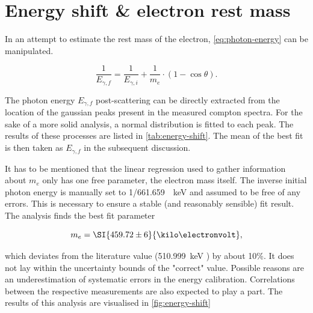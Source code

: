
\section{Energy shift \& electron rest mass}
\label{sec:energy-shift}

In an attempt to estimate the rest mass of the electron, \autoref{eq:photon-energy}
can be manipulated.

\begin{equation}
\label{eq:linear-regression}
\frac{1}{E_{\gamma,f}} = \frac{1}{E_{\gamma,i}} + \frac{1}{m_e}\cdot\left(1-\cos\theta\right).
\end{equation}

The photon energy $E_{\gamma,f}$ post-scattering can be directly extracted from the
location of the gaussian peaks present in the measured compton spectra. For the sake
of a more solid analysis, a normal distribution is fitted to each peak. The results
of these processes are listed in \autoref{tab:energy-shift}. The mean of the best fit
is then taken as $E_{\gamma,f}$ in the subsequent discussion.



It has to be mentioned that the linear regression used to gather information about
$m_e$ only has one free parameter, the electron mass itself. The inverse initial
photon energy is manually set to \SI{1/661.659}{\per\kilo\electronvolt} and assumed
to be free of any errors. This is necessary to ensure a stable (and reasonably
sensible) fit result. The analysis finds the best fit parameter

\begin{equation}
\label{eq:electron-mass-estimate}
	m_e = \SI{459.72 \pm 6}{\kilo\electronvolt},
\end{equation}

which deviates from the literature value (\SI{510.999}{\kilo\electronvolt}
\cite{patrignani2016review}) by about 10\%. It does not lay within the uncertainty
bounds of the "correct" value. Possible reasons are an underestimation of systematic
errors in the energy calibration. Correlations between the respective measurements
are also expected to play a part. The results of this analysis are visualised in
\autoref{fig:energy-shift}

